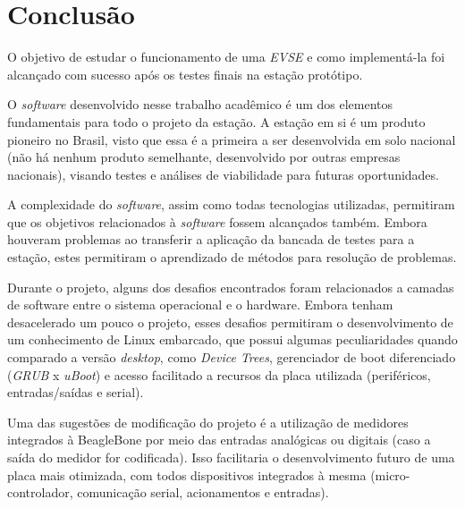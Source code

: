 \chapter{Conclusão}
\label{stateofart:conclusion}

  O objetivo de estudar o funcionamento de uma \textit{\ac{EVSE}} e como implementá-la foi alcançado com sucesso após os testes finais na estação protótipo.

  O \textit{software} desenvolvido nesse trabalho acadêmico é um dos elementos fundamentais para todo o projeto da estação. A estação em si é um produto pioneiro no Brasil, visto que essa é a primeira a ser desenvolvida em solo nacional (não há nenhum produto semelhante, desenvolvido por outras empresas nacionais), visando testes e análises de viabilidade para futuras oportunidades.

  A complexidade do \textit{software}, assim como todas tecnologias utilizadas, permitiram que os objetivos relacionados à \textit{software} fossem alcançados também. Embora houveram problemas ao transferir a aplicação da bancada de testes para a estação, estes permitiram o aprendizado de métodos para resolução de problemas.

  Durante o projeto, alguns dos desafios encontrados foram relacionados a camadas de software entre o sistema operacional e o hardware. Embora tenham desacelerado um pouco o projeto, esses desafios permitiram o desenvolvimento de um conhecimento de Linux embarcado, que possui algumas peculiaridades quando comparado a versão \textit{desktop}, como \textit{Device Trees}, gerenciador de boot diferenciado (\textit{GRUB} x \textit{uBoot}) e acesso facilitado a recursos da placa utilizada (periféricos, entradas/saídas e serial).

  Uma das sugestões de modificação do projeto é a utilização de medidores integrados à BeagleBone por meio das entradas analógicas ou digitais (caso a saída do medidor for codificada). Isso facilitaria o desenvolvimento futuro de uma placa mais otimizada, com todos dispositivos integrados à mesma (micro-controlador, comunicação serial, acionamentos e entradas).
  
